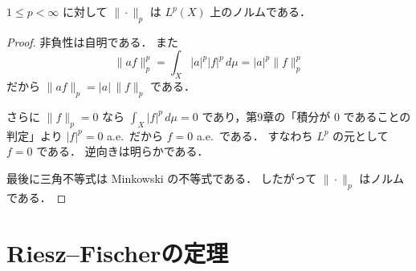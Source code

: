 \begin{proposition}
$1\le p<\infty$ に対して
$\|\cdot\|_p$ は $L^p(X)$ 上のノルムである．
\end{proposition}
\begin{proof}
非負性は自明である．
また
\[
\|af\|_p^p
=
\int_X |a|^p|f|^p\,d\mu
=
|a|^p\|f\|_p^p
\]
だから
$\|af\|_p=|a|\,\|f\|_p$ である．

さらに $\|f\|_p=0$ なら
$\int_X |f|^p\,d\mu=0$ であり，第9章の「積分が $0$ であることの判定」より
$|f|^p=0$ a.e.\ だから $f=0$ a.e.\ である．
すなわち $L^p$ の元として $f=0$ である．
逆向きは明らかである．

最後に三角不等式は Minkowski の不等式である．
したがって $\|\cdot\|_p$ はノルムである．
\end{proof}

\section{Riesz--Fischerの定理}

